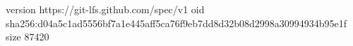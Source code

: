 version https://git-lfs.github.com/spec/v1
oid sha256:d04a5c1ad5556bf7a1e445aff5ca76f9eb7dd8d32b08d2998a30994934b95e1f
size 87420
